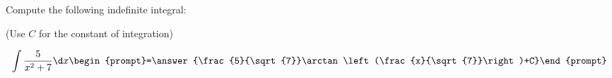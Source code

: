 \documentclass{ximera}
\author{Jim Talamo}
\begin{document}
\begin{exercise}
Compute the following indefinite integral:

\begin{prompt} (Use $C$ for the constant of integration) \end{prompt}

\[
\int \frac{5}{x^2+7} \d x 
\begin{prompt}=\answer{\frac{5}{\sqrt{7}}\arctan\left(\frac{x}{\sqrt{7}}\right)+C}\end{prompt}
\]
\end{exercise}
\end{document}
